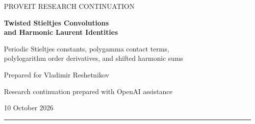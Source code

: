 \documentclass[11pt,letterpaper]{article}
\numberwithin{equation}{section}
\theoremstyle{plain}
\theoremstyle{definition}
\theoremstyle{remark}
\begin{document}
\begin{titlepage}
\thispagestyle{empty}
{\color{Accent}\large PROVEIT RESEARCH CONTINUATION\par}
\vspace{1.25cm}
{\color{Ink}\huge\bfseries Twisted Stieltjes Convolutions\\[5pt]
and Harmonic Laurent Identities\par}
\vspace{0.65cm}
{\Large Periodic Stieltjes constants, polygamma contact terms,\\
polylogarithm order derivatives, and shifted harmonic sums\par}
\vspace{0.8cm}
{\large Prepared for Vladimir Reshetnikov\par}
{\small Research continuation prepared with OpenAI assistance\par}
{\large 10 October 2026\par}
\vspace{0.7cm}
\noindent\textcolor{Accent}{\rule{\textwidth}{0.6pt}}
\begin{abstract}
We continue the exact-identity programme of the ProveIt polylogarithm
manuscript in two directions. First, we answer an archived research
question about the all-index half-twist Stieltjes multiplication law,
including point-supported counterterms. A meromorphic periodic Lerch
family gives the construction for every real nonintegral twist. Its
convolution identity is the full Dirac mass, and its covariant
derivative correction is an explicit harmonic-number multiple of a
Dirac derivative. Rational twists reduce to finite Hurwitz and
Stieltjes combinations. At the half-twist, an ordinary convergent
subtracted digamma integral evaluates in terms of
\(\log\Gamma(1/4)\), Euler's constant, and logarithms.
An exact zero-frequency subtraction controls the untwisted limit.

Second, a two-variable Mellin continuation determines every principal
Laurent coefficient and finite part of
\(\sum_{n\geq1}H_{n-1}(\{1\}^r)/(n+a)^s\)
at \(s=1\) and at all nonpositive integers. Gamma and generalized
Bernoulli coefficients give a finite formula at every harmonic depth
and complex outer shift. We derive residue-aware differentiation,
depth-mixing reflection, rational multiplication, and complete
antiderivative ladders for these coefficient polynomials, with
explicit half-shift examples.


\end{abstract}
\end{titlepage}
\end{document}

